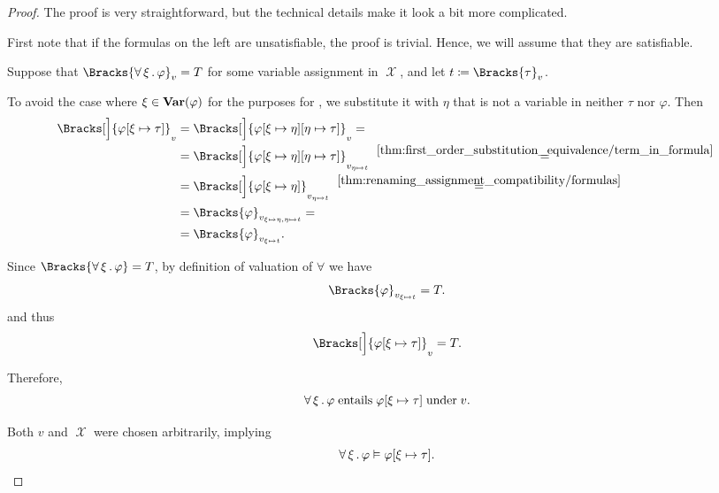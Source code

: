 \begin{proof}
  The proof is very straightforward, but the technical details make it look a bit more complicated.

  First note that if the formulas on the left are unsatisfiable, the proof is trivial. Hence, we will assume that they are satisfiable.

   Suppose that \( \Bracks{\qforall \xi \varphi}_v = T \) for some variable assignment in \( \mscrX \), and let \( t \coloneqq \Bracks{\tau}_v \).

  To avoid the case where \( \xi \in \operatorname{\mathbf{Var}}(\varphi) \) for the purposes for , we substitute it with \( \eta \) that is not a variable in neither \( \tau \) nor \( \varphi \). Then
  \begin{align*}
    \Bracks[\Big]{\varphi[\xi \mapsto \tau]}_v
    &=
    \Bracks[\Big]{\varphi[\xi \mapsto \eta][\eta \mapsto \tau]}_v
    = \\ &=
    \Bracks[\Big]{\varphi[\xi \mapsto \eta][\eta \mapsto \tau]}_{v_{\eta \mapsto t}}
    \reloset {\ref{thm:first_order_substitution_equivalence/term_in_formula}} = \\ &=
    \Bracks[\Big]{\varphi[\xi \mapsto \eta]}_{v_{\eta \mapsto t}}
    \reloset {\ref{thm:renaming_assignment_compatibility/formulas}} = \\ &=
    \Bracks{\varphi}_{v_{\xi \mapsto \eta, \eta \mapsto t}}
    = \\ &=
    \Bracks{\varphi}_{v_{\xi \mapsto t}}.
  \end{align*}

  Since \( \Bracks{\qforall \xi \varphi} = T \), by definition of valuation of \( \forall \) we have
  \begin{equation*}
    \Bracks{\varphi}_{v_{\xi \mapsto t}} = T.
  \end{equation*}
  and thus
  \begin{equation*}
    \Bracks[\Big]{\varphi[\xi \mapsto \tau]}_v = T.
  \end{equation*}

  Therefore,
  \begin{equation*}
    \qforall \xi \varphi \T{entails} \varphi[\xi \mapsto \tau] \T{under} v.
  \end{equation*}

  Both \( v \) and \( \mscrX \) were chosen arbitrarily, implying
  \begin{equation*}
    \forall \thinspace \xi \thinspace . \thinspace \varphi \vDash \varphi[\xi \mapsto \tau].
  \end{equation*}


\end{proof}
